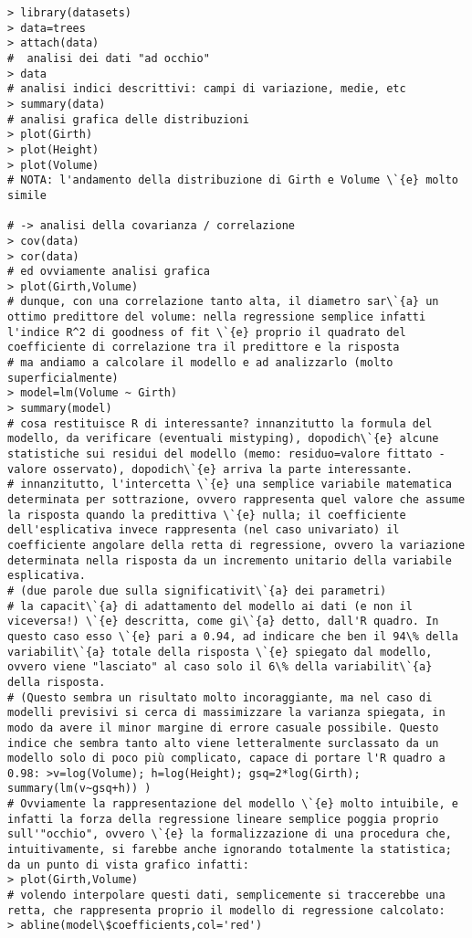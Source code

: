 \documentclass{book}
\begin{document}
\begin{verbatim}
> library(datasets)
> data=trees
> attach(data)
#  analisi dei dati "ad occhio"
> data
# analisi indici descrittivi: campi di variazione, medie, etc
> summary(data)
# analisi grafica delle distribuzioni
> plot(Girth)
> plot(Height)
> plot(Volume)
# NOTA: l'andamento della distribuzione di Girth e Volume \`{e} molto simile

# -> analisi della covarianza / correlazione
> cov(data)
> cor(data)
# ed ovviamente analisi grafica
> plot(Girth,Volume)
# dunque, con una correlazione tanto alta, il diametro sar\`{a} un ottimo predittore del volume: nella regressione semplice infatti l'indice R^2 di goodness of fit \`{e} proprio il quadrato del coefficiente di correlazione tra il predittore e la risposta
# ma andiamo a calcolare il modello e ad analizzarlo (molto superficialmente)
> model=lm(Volume ~ Girth)
> summary(model)
# cosa restituisce R di interessante? innanzitutto la formula del modello, da verificare (eventuali mistyping), dopodich\`{e} alcune statistiche sui residui del modello (memo: residuo=valore fittato - valore osservato), dopodich\`{e} arriva la parte interessante.
# innanzitutto, l'intercetta \`{e} una semplice variabile matematica determinata per sottrazione, ovvero rappresenta quel valore che assume la risposta quando la predittiva \`{e} nulla; il coefficiente dell'esplicativa invece rappresenta (nel caso univariato) il coefficiente angolare della retta di regressione, ovvero la variazione determinata nella risposta da un incremento unitario della variabile esplicativa.
# (due parole due sulla significativit\`{a} dei parametri)
# la capacit\`{a} di adattamento del modello ai dati (e non il viceversa!) \`{e} descritta, come gi\`{a} detto, dall'R quadro. In questo caso esso \`{e} pari a 0.94, ad indicare che ben il 94\% della variabilit\`{a} totale della risposta \`{e} spiegato dal modello, ovvero viene "lasciato" al caso solo il 6\% della variabilit\`{a} della risposta.
# (Questo sembra un risultato molto incoraggiante, ma nel caso di modelli previsivi si cerca di massimizzare la varianza spiegata, in modo da avere il minor margine di errore casuale possibile. Questo indice che sembra tanto alto viene letteralmente surclassato da un modello solo di poco più complicato, capace di portare l'R quadro a 0.98: >v=log(Volume); h=log(Height); gsq=2*log(Girth); summary(lm(v~gsq+h)) )
# Ovviamente la rappresentazione del modello \`{e} molto intuibile, e infatti la forza della regressione lineare semplice poggia proprio sull'"occhio", ovvero \`{e} la formalizzazione di una procedura che, intuitivamente, si farebbe anche ignorando totalmente la statistica; da un punto di vista grafico infatti:
> plot(Girth,Volume)
# volendo interpolare questi dati, semplicemente si traccerebbe una retta, che rappresenta proprio il modello di regressione calcolato:
> abline(model\$coefficients,col='red')
\end{verbatim}
\end{document}
